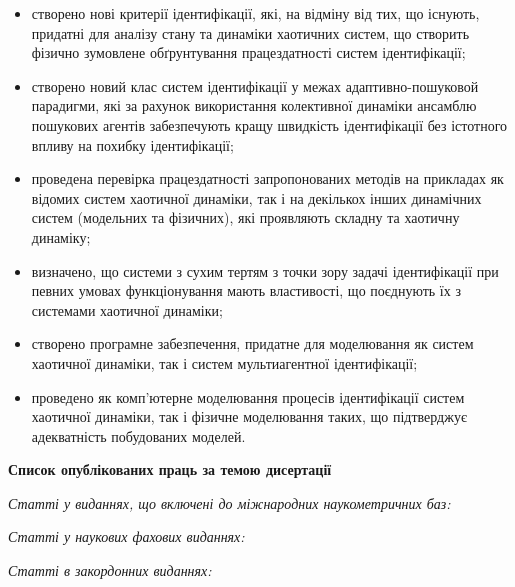 \documentclass[a4paper,13pt]{atuaref}
\newcommand{\xsect}[1]{\vspace{0.15ex}\begin{center}\textbf{#1}\end{center}\vspace{4pt}\penalty10000}
\newcommand{\xxxsect}[1]{\vspace{0.02ex}\textit{#1}\vspace{0.02ex}\penalty10000}
\begin{document}
\begin{itemize}

  \item
    створено нові критерії ідентифікації, які, на відміну від тих, що
    існують, придатні для аналізу стану та динаміки
    хаотичних систем, що створить фізично зумовлене обґрунтування працездатності систем
    ідентифікації;

  \item
    створено новий клас систем ідентифікації у межах
    адаптивно-пошуковой парадигми,
    які за рахунок використання колективної динаміки
    ансамблю пошукових агентів забезпечують
    кращу швидкість ідентифікації без істотного впливу на похибку ідентифікації;

  \item
    проведена перевірка працездатності запропонованих методів
    на прикладах як відомих систем хаотичної динаміки,
    так і на декількох інших динамічних систем (модельних та фізичних),
    які проявляють складну та хаотичну динаміку;

  \item
   визначено, що системи з сухим тертям з точки зору задачі ідентифікації
   при певних  умовах функціонування
   мають властивості, що поєднують їх з системами хаотичної динаміки;

 \item
  створено програмне забезпечення, придатне для моделювання як систем
  хаотичної динаміки, так і систем мультиагентної ідентифікації;

  \item
  проведено як комп'ютерне моделювання процесів ідентифікації систем
  хаотичної динаміки, так і фізичне моделювання таких, що підтверджує адекватність
  побудованих моделей.


\end{itemize}



\nocite{*}

\xsect{Список опублікованих праць за темою дисертації}

\xxxsect{Статті у виданнях, що включені до міжнародних наукометричних баз:}

\printbibliography[heading=none, keyword=scimetr]


\xxxsect{Статті у наукових фахових виданнях:}

\printbibliography[heading=none, keyword=vak]

\xxxsect{Статті в закордонних виданнях:}
\end{document}
